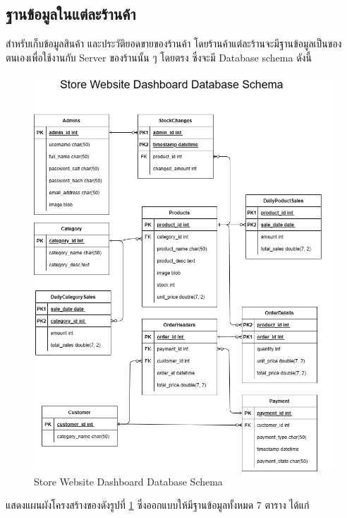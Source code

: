 \subsection{ฐานข้อมูลในแต่ละร้านค้า}
สำหรับเก็บข้อมูลสินค้า และประวัติยอดขายของร้านค้า โดยร้านค้าแต่ละร้านจะมีฐานข้อมูลเป็นของตนเองเพื่อใช้งานกับ Server ของร้านนั้น ๆ
โดยตรง ซึ่งจะมี Database schema ดังนี้

\begin{figure}[h]
  \begin{center}

    \includegraphics[scale=0.3]{pic/dataweb.png}
  \end{center}

  \caption[Store Website Dashboard Database Schema]{Store Website Dashboard Database Schema}
  \label{fig:Store Website Dashboard Database Schema}
\end{figure}
แสดงแผนผังโครงสร้างของดังรูปที่ \ref{fig:Store Website Dashboard Database Schema} ซึ่งออกแบบให้มีฐานข้อมูลทั้งหมด 7 ตาราง ได้แก่ 
